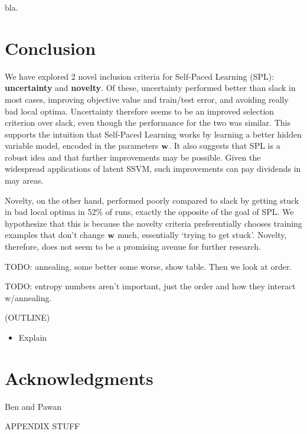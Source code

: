\documentclass{article}
\begin{document}
bla.
\section{Conclusion}

We have explored 2 novel inclusion criteria for Self-Paced Learning ({\sc SPL}): \textbf{uncertainty} and \textbf{novelty}.  Of these, uncertainty performed better than slack in most cases, improving objective value and train/test error, and avoiding really bad local optima.  Uncertainty therefore seems to be an improved selection criterion over slack, even though the performance for the two was similar.  This supports the intuition that Self-Paced Learning works by learning a better hidden variable model, encoded in the parameters $\bf w$.  It also suggests that SPL is a robust idea and that further improvements may be possible.  Given the widespread applications of latent SSVM, such improvements can pay dividends in may areas.

Novelty, on the other hand, performed poorly compared to slack by getting stuck in bad local optima in 52\% of runs, exactly the opposite of the goal of SPL.  We hypothesize that this is because the novelty criteria preferentially chooses training examples that don't change $\bf w$ much, essentially `trying to get stuck'.  Novelty, therefore, does not seem to be a promising avenue for further research.


TODO: annealing, some better some worse, show table.  Then we look at order.

TODO: entropy numbers aren't important, just the order and how they interact w/annealing.


(OUTLINE)
\begin{itemize}
\item Explain 
\end{itemize}

\section{Acknowledgments}

Ben and Pawan

APPENDIX STUFF
\end{document}
